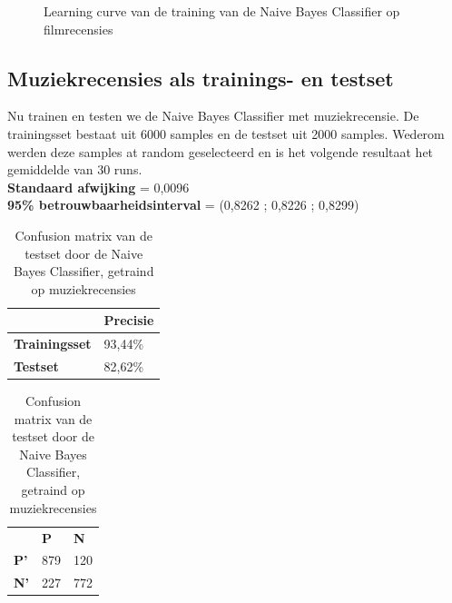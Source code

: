 \begin{figure}[h]%
    \centering
    \label{fig:lc-movie-movie}
    \caption{Learning curve van de training van de Naive Bayes Classifier op filmrecensies}
\end{figure}

\subsection{Muziekrecensies als trainings- en testset}\label{Muziek als trainings- en testset}

Nu trainen en testen we de Naive Bayes Classifier met muziekrecensie. De trainingsset bestaat uit 6000 samples en de testset uit 2000 samples. Wederom werden deze samples at random geselecteerd en is het volgende resultaat het gemiddelde van 30 runs.\\

\textbf{Standaard afwijking} = 0,0096\\
\textbf{95\% betrouwbaarheidsinterval} = (0,8262 ; 0,8226 ; 0,8299)\\
 
\begin{table}[h]
\centering
\setlength\tabcolsep{4pt}
\begin{minipage}[t]{0.48\textwidth}
\centering
\begin{tabular}{l|l|}
\cline{2-2}
                                            & \textbf{Precisie} \\ \hline
\multicolumn{1}{|l|}{\textbf{Trainingsset}} & 93,44\%           \\ \hline
\multicolumn{1}{|l|}{\textbf{Testset}}      & 82,62\%           \\ \hline
\end{tabular}
\caption{Classificatieprecisie Naive Bayes Classifier, getraind op muziekrecensies}
\end{minipage}%
\hfill
\begin{minipage}[t]{0.48\textwidth}
\centering
\begin{tabular}{lll}
                                 & \textbf{P}               & \textbf{N}               \\ \cline{2-3} 
\multicolumn{1}{l|}{\textbf{P'}} & \multicolumn{1}{l|}{879} & \multicolumn{1}{l|}{120} \\ \cline{2-3} 
\multicolumn{1}{l|}{\textbf{N'}} & \multicolumn{1}{l|}{227} & \multicolumn{1}{l|}{772} \\ \cline{2-3} 
\end{tabular}
\caption{Confusion matrix van de testset door de  Naive Bayes Classifier, getraind op muziekrecensies} 
\end{minipage}
\end{table}

